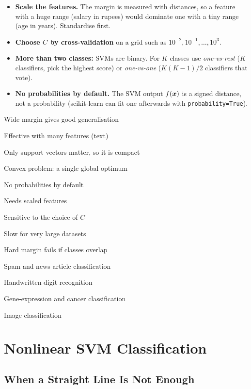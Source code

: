 \begin{itemize}
  \item \textbf{Scale the features.} The margin is measured with distances, so a feature with a huge range (salary in rupees) would dominate one with a tiny range (age in years). Standardise first.
  \item \textbf{Choose $C$ by cross-validation} on a grid such as $10^{-2},10^{-1},\dots,10^{3}$.
  \item \textbf{More than two classes:} SVMs are binary. For $K$ classes use \emph{one-vs-rest} ($K$ classifiers, pick the highest score) or \emph{one-vs-one} ($K(K-1)/2$ classifiers that vote).
  \item \textbf{No probabilities by default.} The SVM output $f(\boldsymbol{x})$ is a signed distance, not a probability (scikit-learn can fit one afterwards with \texttt{probability=True}).
\end{itemize}

{\item Wide margin gives good generalisation
 \item Effective with many features (text)
 \item Only support vectors matter, so it is compact
 \item Convex problem: a single global optimum}
{\item No probabilities by default
 \item Needs scaled features
 \item Sensitive to the choice of $C$
 \item Slow for very large datasets
 \item Hard margin fails if classes overlap}
{\item Spam and news-article classification
 \item Handwritten digit recognition
 \item Gene-expression and cancer classification
 \item Image classification}

\section{Nonlinear SVM Classification}

\subsection{When a Straight Line Is Not Enough}

